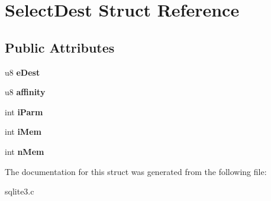 \hypertarget{struct_select_dest}{\section{Select\-Dest Struct Reference}
\label{struct_select_dest}
}
\subsection*{Public Attributes}
\begin{DoxyCompactItemize}
\item 
\hypertarget{struct_select_dest_a779c1809acadd15898db0b20e31cc23f}{u8 {\bfseries e\-Dest}}\label{struct_select_dest_a779c1809acadd15898db0b20e31cc23f}

\item 
\hypertarget{struct_select_dest_a7a5b76f4fd40a1b84356fc58e0d6b173}{u8 {\bfseries affinity}}\label{struct_select_dest_a7a5b76f4fd40a1b84356fc58e0d6b173}

\item 
\hypertarget{struct_select_dest_a6ca726a6f8054df61baa150c5010c53f}{int {\bfseries i\-Parm}}\label{struct_select_dest_a6ca726a6f8054df61baa150c5010c53f}

\item 
\hypertarget{struct_select_dest_ab060aa655304afa76b1a2f923a2b0ae5}{int {\bfseries i\-Mem}}\label{struct_select_dest_ab060aa655304afa76b1a2f923a2b0ae5}

\item 
\hypertarget{struct_select_dest_a1868d637be46616a4206fd8ff9f4ac52}{int {\bfseries n\-Mem}}\label{struct_select_dest_a1868d637be46616a4206fd8ff9f4ac52}

\end{DoxyCompactItemize}


The documentation for this struct was generated from the following file\-:\begin{DoxyCompactItemize}
\item 
sqlite3.\-c\end{DoxyCompactItemize}
